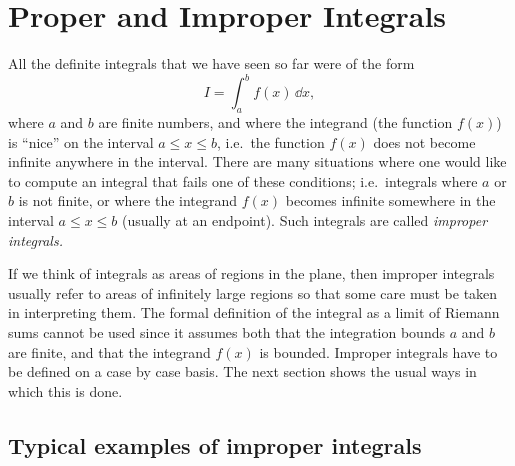 \chapter{Proper and Improper Integrals}%
All the definite integrals that we have seen so far were of the form
\[
I = \int _a^b f(x) \, \dd x,
\]
where $a$ and $b$ are finite numbers, and where the integrand (the function
$f(x)$) is ``nice'' on the interval $a\leq x\leq b$, i.e.~the function $f(x)$
does not become infinite anywhere in the interval.  There are many situations
where one would like to compute an integral that fails one of these conditions;
i.e.~integrals where $a$ or $b$ is not finite, or where the integrand $f(x)$
becomes infinite somewhere in the interval $a\leq x\leq b$ (usually at an
endpoint).  Such integrals are called \emph{improper integrals. }

If we think of integrals as areas of regions in the plane, then improper
integrals usually refer to areas of infinitely large regions so that some
care must be taken in interpreting them.  The formal definition of the integral
as a limit of Riemann sums cannot be used since it assumes both that the
integration bounds $a$ and $b$ are finite, and that the integrand $f(x)$ is
bounded.  Improper integrals have to be defined on a case by case basis.  The
next section shows the usual ways in which this is done.

\section{Typical examples of improper integrals} %

